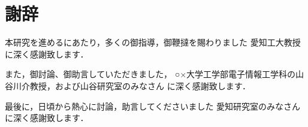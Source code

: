 \chapter*{謝辞}

本研究を進めるにあたり，多くの御指導，御鞭撻を賜わりました
愛知工大教授に深く感謝致します．

また，御討論、御助言していただきました，
○×大学工学部電子情報工学科の山谷川介教授，および山谷研究室のみなさん
に深く感謝致します．

最後に，日頃から熱心に討論，助言してくださいました
愛知研究室のみなさんに深く感謝致します．

